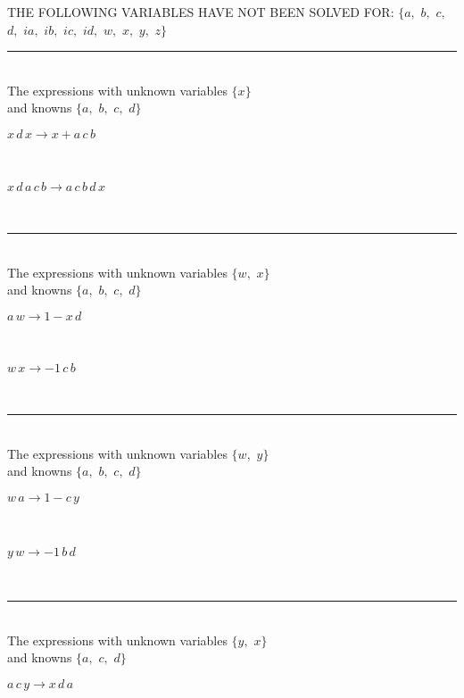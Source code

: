 THE FOLLOWING VARIABLES HAVE NOT BEEN SOLVED FOR:\hfil\break
$\{a,
$ $
b,
$ $
c,
$ $
d,
$ $
ia,
$ $
ib,
$ $
ic,
$ $
id,
$ $
w,
$ $
x,
$ $
y,
$ $
z\}$
\smallskip\\
\rule[3pt]{6in}{.7pt}\\
The expressions with unknown variables $\{x\}$\\
and knowns $\{a,
$ $
b,
$ $
c,
$ $
d\}$\smallskip\\
\begin{minipage}{6in}
$
x\,
 d\,
 x\rightarrow x + a\,
 c\,
 b
$
\end{minipage}\medskip \\
\begin{minipage}{6in}
$
x\,
 d\,
 a\,
 c\,
 b\rightarrow a\,
 c\,
 b\,
 d\,
 x
$
\end{minipage}\\
\rule[3pt]{6in}{.7pt}\\
The expressions with unknown variables $\{w,
$ $
x\}$\\
and knowns $\{a,
$ $
b,
$ $
c,
$ $
d\}$\smallskip\\
\begin{minipage}{6in}
$
a\,
 w\rightarrow 1 - x\,
 d
$
\end{minipage}\medskip \\
\begin{minipage}{6in}
$
w\,
 x\rightarrow -1\,
 c\,
 b
$
\end{minipage}\\
\rule[3pt]{6in}{.7pt}\\
The expressions with unknown variables $\{w,
$ $
y\}$\\
and knowns $\{a,
$ $
b,
$ $
c,
$ $
d\}$\smallskip\\
\begin{minipage}{6in}
$
w\,
 a\rightarrow 1 - c\,
 y
$
\end{minipage}\medskip \\
\begin{minipage}{6in}
$
y\,
 w\rightarrow -1\,
 b\,
 d
$
\end{minipage}\\
\rule[3pt]{6in}{.7pt}\\
The expressions with unknown variables $\{y,
$ $
x\}$\\
and knowns $\{a,
$ $
c,
$ $
d\}$\smallskip\\
\begin{minipage}{6in}
$
a\,
 c\,
 y\rightarrow x\,
 d\,
 a
$
\end{minipage}\\
